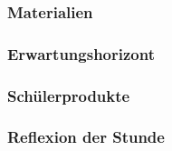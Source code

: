 \subsubsection{Materialien}
\subsubsection{Erwartungshorizont}
\subsubsection{Schülerprodukte}
\subsubsection{Reflexion der Stunde}